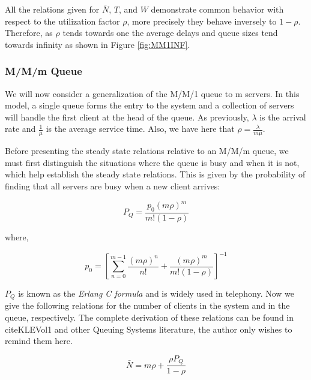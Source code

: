 
All the relations given for $\bar{N}$, $T$, and $W$ demonstrate common behavior with respect to the utilization factor $\rho$, more precisely they behave inversely to $1 - \rho$. Therefore, as $\rho$ tends towards one the average delays and queue sizes tend towards infinity as shown in Figure \ref{fig:MM1INF}.


\subsubsection{M/M/m Queue}
\label{sect:mmmQ}

We will now consider a generalization of the M/M/1 queue to m servers. In this model, a single queue forms the entry to the system and a collection of servers will handle the first client at the head of the queue. As previously, $\lambda$ is the arrival rate and $\frac{1}{\mu}$ is the average service time. Also, we have here that $\rho = \frac{\lambda}{m\mu}$.

Before presenting the steady state relations relative to an M/M/m queue, we must first distinguish the situations where the queue is busy and when it is not, which help establish the steady state relations. This is given by the probability of finding that all servers are busy when a new client arrives:

\begin{equation}
P_{Q} = \frac{p_{0}(m\rho)^{m}}{m!(1-\rho)}
\label{eq:MMMPQ}
\end{equation}

where,

\begin{equation}
p_{0} = \left[ \displaystyle\sum\limits_{n=0}^{m-1} \frac{(m\rho)^{n}}{n!} + \frac{(m\rho)^{m}}{m!(1-\rho)}\right]^{-1}
\label{MMMP0}
\end{equation}

$P_{Q}$ is known as the \emph{Erlang C formula} \cite{Erlang} and is widely used in telephony. Now we give the following relations for the number of clients in the system and in the queue, respectively. The complete derivation of these relations can be found in cite{KLEVol1} and other Queuing Systems literature, the author only wishes to remind them here.

\begin{equation}
 \bar{N} = m\rho + \frac{\rho P_{Q}}{1-\rho}
\label{eq:MMMN} 
\end{equation}

